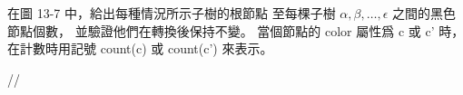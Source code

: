 \startEXERCISE
在圖 13-7 中，給出每種情況所示子樹的根節點
至每棵子樹 $\alpha,\beta,\ldots,\epsilon$ 之間的黑色節點個數，
並驗證他們在轉換後保持不變。
當個節點的 color 屬性爲 c 或 c' 時，
在計數時用記號 count(c) 或 count(c') 來表示。
\stopEXERCISE

\startANSWER
//
\stopANSWER
